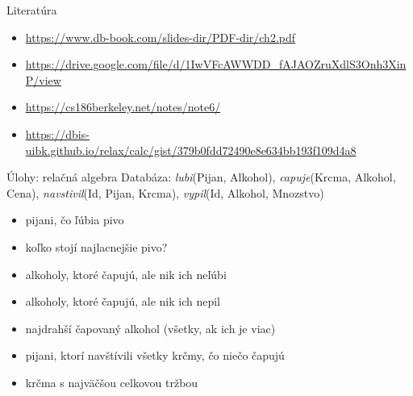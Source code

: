 \documentclass[12pt]{beamer}
\begin{document}
\begin{frame}{Literatúra}
\begin{itemize}
\item {\scriptsize\url{https://www.db-book.com/slides-dir/PDF-dir/ch2.pdf}}
\item {\scriptsize\url{https://drive.google.com/file/d/1IwVFcAWWDD_fAJAOZruXdlS3Onh3XinP/view}}
\item {\scriptsize\url{https://cs186berkeley.net/notes/note6/}}
\item {\scriptsize\url{https://dbis-uibk.github.io/relax/calc/gist/379b0fdd72490e8e634bb193f109d4a8}}
\end{itemize}
\end{frame}


\begin{frame}{Úlohy: relačná algebra}
Databáza: \emph{lubi}(Pijan, Alkohol), \emph{capuje}(Krcma, Alkohol, Cena),
\emph{navstivil}(Id, Pijan, Krcma), \emph{vypil}(Id, Alkohol, Mnozstvo)
\begin{itemize}
	\item pijani, čo ľúbia pivo
	\item koľko stojí najlacnejšie pivo?
    \item alkoholy, ktoré čapujú, ale nik ich neľúbi
    \item alkoholy, ktoré čapujú, ale nik ich nepil
	\item najdrahší čapovaný alkohol (všetky, ak ich je viac)
	\item pijani, ktorí navštívili všetky krčmy, čo niečo čapujú
    \item krčma s najväčšou celkovou tržbou
\end{itemize}
\end{frame}
\end{document}
